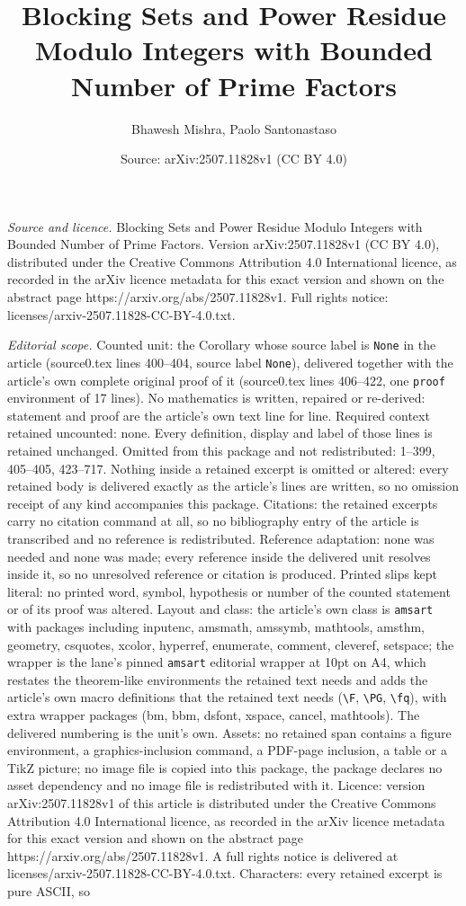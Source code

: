 \documentclass[10pt,a4paper]{amsart}
\title[Blocking Sets and Power Residue Modulo Integers with Bounded]{Blocking Sets and Power Residue Modulo Integers with Bounded Number of Prime Factors}
\author{Bhawesh Mishra, Paolo Santonastaso}
\date{Source: arXiv:2507.11828v1 (CC BY 4.0)}
\begin{document}
\maketitle

\noindent\emph{Source and licence.} Blocking Sets and Power Residue Modulo Integers with Bounded Number of Prime Factors. Version arXiv:2507.11828v1 (CC BY 4.0), distributed under the Creative Commons Attribution 4.0 International licence, as recorded in the arXiv licence metadata for this exact version and shown on the abstract page https://arxiv.org/abs/2507.11828v1. Full rights notice: licenses/arxiv-2507.11828-CC-BY-4.0.txt.\par\smallskip

\noindent\textit{Editorial scope.} Counted unit: the Corollary whose source label is \texttt{None} in the article (source0.tex lines 400--404, source label \texttt{None}), delivered together with the article's own complete original proof of it (source0.tex lines 406--422, one \texttt{proof} environment of 17 lines). No mathematics is written, repaired or re-derived: statement and proof are the article's own text line for line. Required context retained uncounted: none. Every definition, display and label of those lines is retained unchanged. Omitted from this package and not redistributed: 1--399, 405--405, 423--717. Nothing inside a retained excerpt is omitted or altered: every retained body is delivered exactly as the article's lines are written, so no omission receipt of any kind accompanies this package. Citations: the retained excerpts carry no citation command at all, so no bibliography entry of the article is transcribed and no reference is redistributed. Reference adaptation: none was needed and none was made; every reference inside the delivered unit resolves inside it, so no unresolved reference or citation is produced. Printed slips kept literal: no printed word, symbol, hypothesis or number of the counted statement or of its proof was altered. Layout and class: the article's own class is \texttt{amsart} with packages including inputenc, amsmath, amssymb, mathtools, amsthm, geometry, csquotes, xcolor, hyperref, enumerate, comment, cleveref, setspace; the wrapper is the lane's pinned \texttt{amsart} editorial wrapper at 10pt on A4, which restates the theorem-like environments the retained text needs and adds the article's own macro definitions that the retained text needs (\texttt{\textbackslash F}, \texttt{\textbackslash PG}, \texttt{\textbackslash fq}), with extra wrapper packages (bm, bbm, dsfont, xspace, cancel, mathtools). The delivered numbering is the unit's own. Assets: no retained span contains a figure environment, a graphics-inclusion command, a PDF-page inclusion, a table or a TikZ picture; no image file is copied into this package, the package declares no asset dependency and no image file is redistributed with it. Licence: version arXiv:2507.11828v1 of this article is distributed under the Creative Commons Attribution 4.0 International licence, as recorded in the arXiv licence metadata for this exact version and shown on the abstract page https://arxiv.org/abs/2507.11828v1. A full rights notice is delivered at licenses/arxiv-2507.11828-CC-BY-4.0.txt. Characters: every retained excerpt is pure ASCII, so 
\end{document}
